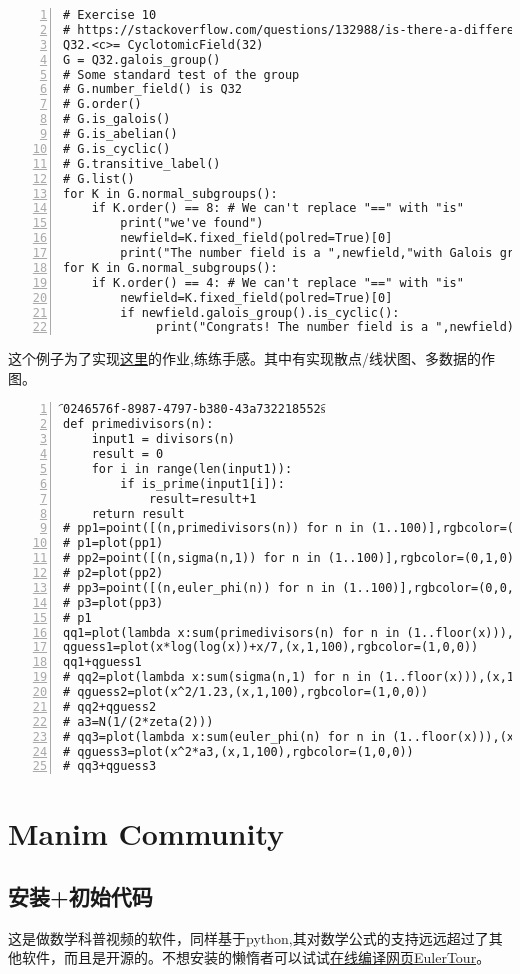 \documentclass[11pt]{amsart}
\begin{document}
\begin{lstlisting}[numbers=left,numberstyle=\tiny,numbersep=10pt]
# Exercise 10
# https://stackoverflow.com/questions/132988/is-there-a-difference-between-and-is
Q32.<c>= CyclotomicField(32) 
G = Q32.galois_group()
# Some standard test of the group
# G.number_field() is Q32
# G.order()
# G.is_galois()
# G.is_abelian()
# G.is_cyclic()
# G.transitive_label()
# G.list()
for K in G.normal_subgroups():
    if K.order() == 8: # We can't replace "==" with "is"
        print("we've found")
        newfield=K.fixed_field(polred=True)[0]
        print("The number field is a ",newfield,"with Galois group of order",newfield.galois_group().order())
for K in G.normal_subgroups():
    if K.order() == 4: # We can't replace "==" with "is"
        newfield=K.fixed_field(polred=True)[0]
        if newfield.galois_group().is_cyclic():
             print("Congrats! The number field is a ",newfield)
\end{lstlisting}
这个例子为了实现\href{https://ctnt-summer.math.uconn.edu/wp-content/uploads/sites/1632/2020/06/CTNTsieves_problems.pdf}{这里}的作业,练练手感。其中有实现散点/线状图、多数据的作图。
\begin{lstlisting}[numbers=left,numberstyle=\tiny,numbersep=10pt]
︠0246576f-8987-4797-b380-43a732218552s︠
def primedivisors(n):
    input1 = divisors(n)
    result = 0
    for i in range(len(input1)):
        if is_prime(input1[i]):
            result=result+1
    return result
# pp1=point([(n,primedivisors(n)) for n in (1..100)],rgbcolor=(1,0,0))
# p1=plot(pp1)
# pp2=point([(n,sigma(n,1)) for n in (1..100)],rgbcolor=(0,1,0))
# p2=plot(pp2)
# pp3=point([(n,euler_phi(n)) for n in (1..100)],rgbcolor=(0,0,1))
# p3=plot(pp3)
# p1
qq1=plot(lambda x:sum(primedivisors(n) for n in (1..floor(x))),(x,1,100),rgbcolor=(1,0,0))
qguess1=plot(x*log(log(x))+x/7,(x,1,100),rgbcolor=(1,0,0))
qq1+qguess1
# qq2=plot(lambda x:sum(sigma(n,1) for n in (1..floor(x))),(x,1,100),rgbcolor=(1,0,0))
# qguess2=plot(x^2/1.23,(x,1,100),rgbcolor=(1,0,0))
# qq2+qguess2
# a3=N(1/(2*zeta(2)))
# qq3=plot(lambda x:sum(euler_phi(n) for n in (1..floor(x))),(x,1,100),rgbcolor=(1,0,0))
# qguess3=plot(x^2*a3,(x,1,100),rgbcolor=(1,0,0))
# qq3+qguess3
\end{lstlisting}


\section{Manim Community}
\subsection{安装+初始代码}
这是做数学科普视频的软件，同样基于python,其对数学公式的支持远远超过了其他软件，而且是开源的。不想安装的懒惰者可以试试\href{https://eulertour.com/lab}{在线编译网页EulerTour}。
\end{document}
